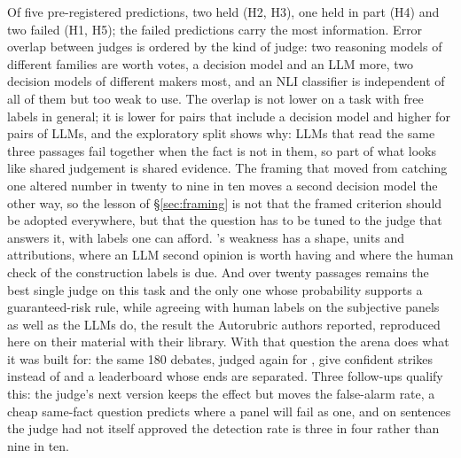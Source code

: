 Of five pre-registered predictions, two held (H2, H3), one held in part (H4) and two failed (H1, H5); the failed predictions carry the most information. Error overlap between judges is ordered by the kind of judge: two reasoning models of different families are worth \studyVotesLunaChatDeepSeekPro{} votes, a decision model and an LLM more, two decision models of different makers most, and an NLI classifier is independent of all of them but too weak to use. The overlap is not lower on a task with free labels in general; it is lower for pairs that include a decision model and higher for pairs of LLMs, and the exploratory split shows why: LLMs that read the same three passages fail together when the fact is not in them, so part of what looks like shared judgement is shared evidence. The framing that moved \jev{} from catching one altered number in twenty to nine in ten moves a second decision model the other way, so the lesson of \S\ref{sec:framing} is not that the framed criterion should be adopted everywhere, but that the question has to be tuned to the judge that answers it, with labels one can afford. \jev{}'s weakness has a shape, units and attributions, where an LLM second opinion is worth having and where the human check of the construction labels is due. And \jev{} over twenty passages remains the best single judge on this task and the only one whose probability supports a guaranteed-risk rule, while agreeing with human labels on the subjective panels as well as the LLMs do, the result the Autorubric authors reported, reproduced here on their material with their library. With that question the arena does what it was built for: the same 180 debates, judged again for \studyLbCost{}, give \studyLbContradictedConfident{} confident strikes instead of \studyLbPilotStruck{} and a leaderboard whose ends are separated. Three follow-ups qualify this: the judge's next version keeps the effect but moves the false-alarm rate, a cheap same-fact question predicts where a panel will fail as one, and on sentences the judge had not itself approved the detection rate is three in four rather than nine in ten.
\FloatBarrier
